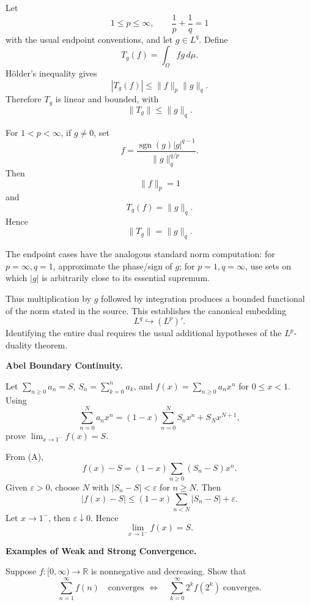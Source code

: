 \begin{solution}
Let
\[
1\le p\le\infty,
\qquad
\frac1p+\frac1q=1
\]
with the usual endpoint conventions, and let \(g\in L^q\). Define
\[
T_g(f)=\int_\Omega f g\,d\mu.
\]
Hölder's inequality gives
\[
|T_g(f)|
\le
\|f\|_p\|g\|_q.
\]
Therefore \(T_g\) is linear and bounded, with
\[
\|T_g\|
\le
\|g\|_q.
\]

For \(1<p<\infty\), if \(g\neq0\), set
\[
f
=
\frac{
\operatorname{sgn}(g)|g|^{q-1}
}{
\|g\|_q^{q/p}
}.
\]
Then
\[
\|f\|_p=1
\]
and
\[
T_g(f)=\|g\|_q.
\]
Hence
\[
\boxed{\|T_g\|=\|g\|_q.}
\]

The endpoint cases have the analogous standard norm computation:
for \(p=\infty,q=1\), approximate the phase/sign of \(g\); for
\(p=1,q=\infty\), use sets on which \(|g|\) is arbitrarily close to its essential supremum.

Thus multiplication by \(g\) followed by integration produces a bounded functional of the
norm stated in the source. This establishes the canonical embedding
\[
L^q\hookrightarrow(L^p)'.
\]
Identifying the entire dual requires the usual additional hypotheses of the \(L^p\)-duality
theorem.
\end{solution}


\begin{problem}[CP-II-0079]
\label{prob:cp-ii-0079}
\textbf{Abel Boundary Continuity.}

\hspace*{1.5em}Let \(\sum_{n\ge0}a_n=S\), \(S_n=\sum_{k=0}^na_k\), and \(f(x)=\sum_{n\ge0}a_nx^n\) for \(0\le x<1\). Using
\[
\sum_{n=0}^N a_nx^n=(1-x)\sum_{n=0}^NS_nx^n+S_Nx^{N+1},\tag{A}
\]
prove \(\lim_{x\to1^-}f(x)=S\).
\end{problem}

\begin{solution}
From (A),
\[
f(x)-S=(1-x)\sum_{n\ge0}(S_n-S)x^n.
\]
Given \(\varepsilon>0\), choose \(N\) with \(|S_n-S|<\varepsilon\) for \(n\ge N\). Then
\[
|f(x)-S|\le(1-x)\sum_{n<N}|S_n-S|+\varepsilon.
\]
Let \(x\to1^-\), then \(\varepsilon\downarrow0\). Hence
\[
\boxed{\lim_{x\to1^-}f(x)=S.}
\]
\end{solution}


\begin{problem}[CP-II-0080]
\label{prob:cp-ii-0080}
\textbf{Examples of Weak and Strong Convergence.}

\hspace*{1.5em}Suppose $f:[0,\infty)\to\mathbb{R}$ is nonnegative and decreasing.
Show that
\[
\sum_{n=1}^\infty f(n) \quad \text{converges } \iff \quad \sum_{k=0}^\infty 2^k f(2^k)\;\text{converges}.
\]
\end{problem}

